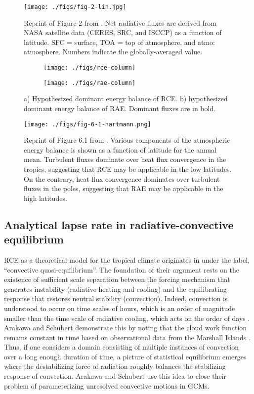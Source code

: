 \documentclass{article}
\begin{document}
\begin{figure}
\centering
\texttt{[image: ./figs/fig-2-lin.jpg]}
\caption{Reprint of Figure 2 from \citet{lin-et-al-2008}. Net radiative fluxes are derived from NASA satellite data (CERES, SRC, and ISCCP) as a function of latitude. SFC = surface, TOA = top of atmosphere, and atmo: atmosphere. Numbers indicate the globally-averaged value.}
\label{fig:fig-2-lin}
\end{figure}

\begin{figure}
\centering
\begin{subfigure}{0.5\textwidth}
\texttt{[image: ./figs/rce-column]}
\end{subfigure}%
\begin{subfigure}{0.5\textwidth}
\texttt{[image: ./figs/rae-column]}
\end{subfigure}
\caption{a) Hypothesized dominant energy balance of RCE. b) hypothesized dominant energy balance of RAE. Dominant fluxes are in bold.}
\label{fig:limit-column}
\end{figure}

\begin{figure}
\centering
\texttt{[image: ./figs/fig-6-1-hartmann.png]}
\caption{Reprint of Figure 6.1 from \citet{hartmann-2015}. Various components of the atmospheric energy balance is shown as a function of latitude for the annual mean. Turbulent fluxes dominate over heat flux convergence in the tropics, suggesting that RCE may be applicable in the low latitudes. On the contrary, heat flux convergence dominates over turbulent fluxes in the poles, suggesting that RAE may be applicable in the high latitudes.}
\label{fig:fig-6-1-hartmann}
\end{figure}

\subsection{Analytical lapse rate in radiative-convective equilibrium}
RCE as a theoretical model for the tropical climate originates in \citet{arakawa-schubert-1974} under the label, ``convective quasi-equilibrium''. The foundation of their argument rests on the existence of sufficient scale separation between the forcing mechanism that generates instability (radiative heating and cooling) and the equilibrating response that restores neutral stability (convection). Indeed, convection is understood to occur on time scales of hours, which is an order of magnitude smaller than the time scale of radiative cooling, which acts on the order of days \citep{manabe-strickler-1964}. Arakawa and Schubert demonstrate this by noting that the cloud work function remains constant in time based on observational data from the Marshall Islands \citep{yanai-et-al-1973}. Thus, if one considers a domain consisting of multiple instances of convection over a long enough duration of time, a picture of statistical equilibrium emerges where the destabilizing force of radiation roughly balances the stabilizing response of convection. Arakawa and Schubert use this idea to close their problem of parameterizing unresolved convective motions in GCMs.
\end{document}
